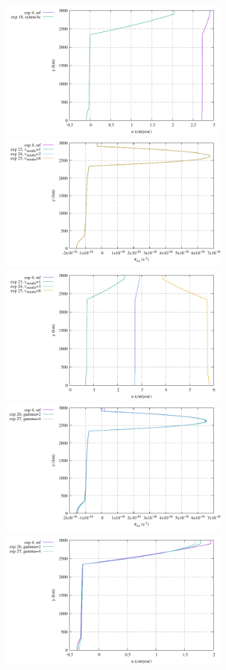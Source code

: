 \begin{center}
\includegraphics[width=8cm]{python_codes/fieldstone_148/results/fig5_u_middle}\\
\includegraphics[width=8cm]{python_codes/fieldstone_148/results/fig6_exx_middle}
\includegraphics[width=8cm]{python_codes/fieldstone_148/results/fig6_u_middle}\\
\includegraphics[width=8cm]{python_codes/fieldstone_148/results/fig7_exx_middle}
\includegraphics[width=8cm]{python_codes/fieldstone_148/results/fig7_u_middle}\\
\end{center}




